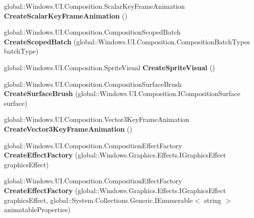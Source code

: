 \begin{DoxyCompactItemize}
global\+::\+Windows.\+U\+I.\+Composition.\+Scalar\+Key\+Frame\+Animation {\bfseries Create\+Scalar\+Key\+Frame\+Animation} ()
\item 
\mbox{\label{interface_windows_1_1_u_i_1_1_composition_1_1_i_compositor_ace9715f39dc12e329752515c931e5b77}} 
global\+::\+Windows.\+U\+I.\+Composition.\+Composition\+Scoped\+Batch {\bfseries Create\+Scoped\+Batch} (global\+::\+Windows.\+U\+I.\+Composition.\+Composition\+Batch\+Types batch\+Type)
\item 
\mbox{\label{interface_windows_1_1_u_i_1_1_composition_1_1_i_compositor_adcaefeb1c16a19b1a8bf373e365eab4e}} 
global\+::\+Windows.\+U\+I.\+Composition.\+Sprite\+Visual {\bfseries Create\+Sprite\+Visual} ()
\item 
\mbox{\label{interface_windows_1_1_u_i_1_1_composition_1_1_i_compositor_a9dce8b6100f7776e8c934df2a289924e}} 
global\+::\+Windows.\+U\+I.\+Composition.\+Composition\+Surface\+Brush {\bfseries Create\+Surface\+Brush} (global\+::\+Windows.\+U\+I.\+Composition.\+I\+Composition\+Surface surface)
\item 
\mbox{\label{interface_windows_1_1_u_i_1_1_composition_1_1_i_compositor_a7cda6336654224115f835339f7968fb1}} 
global\+::\+Windows.\+U\+I.\+Composition.\+Vector3\+Key\+Frame\+Animation {\bfseries Create\+Vector3\+Key\+Frame\+Animation} ()
\item 
\mbox{\label{interface_windows_1_1_u_i_1_1_composition_1_1_i_compositor_a741d4bb0d7eef4b99352ca5c3f31e3ab}} 
global\+::\+Windows.\+U\+I.\+Composition.\+Composition\+Effect\+Factory {\bfseries Create\+Effect\+Factory} (global\+::\+Windows.\+Graphics.\+Effects.\+I\+Graphics\+Effect graphics\+Effect)
\item 
\mbox{\label{interface_windows_1_1_u_i_1_1_composition_1_1_i_compositor_ad3ceab4f5a5f9bcd7b75ff2449c924f2}} 
global\+::\+Windows.\+U\+I.\+Composition.\+Composition\+Effect\+Factory {\bfseries Create\+Effect\+Factory} (global\+::\+Windows.\+Graphics.\+Effects.\+I\+Graphics\+Effect graphics\+Effect, global\+::\+System.\+Collections.\+Generic.\+I\+Enumerable$<$ string $>$ animatable\+Properties)

\end{DoxyCompactItemize}
